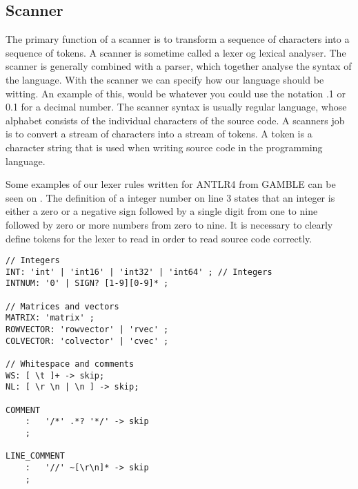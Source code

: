 \subsection{Scanner}
The primary function of a scanner is to transform a sequence of characters into a sequence of tokens.
A scanner is sometime called a lexer og lexical analyser.
The scanner is generally combined with a parser, which together analyse the syntax of the language.
With the scanner we can specify how our language should be witting. 
An example of this, would be whatever you could use the notation .1 or 0.1 for a decimal number.
The scanner syntax is usually regular language, whose alphabet consists of the individual characters of the source code.
A scanners job is to convert a stream of characters into a stream of tokens.
A token is a character string that is used when writing source code in the programming language.

Some examples of our lexer rules written for ANTLR4 from GAMBLE can be seen on .
The definition of a integer number on line 3 states that an integer is either a zero or a negative sign followed by a single digit from one to nine followed by zero or more numbers from zero to nine.
It is necessary to clearly define tokens for the lexer to read in order to read source code correctly. \citep{Crafting_book}

\begin{lstlisting}[caption=Example of our lexer rules for ANTLR4,frame=tlrb,label={lst:token}]
// Integers
INT: 'int' | 'int16' | 'int32' | 'int64' ; // Integers
INTNUM: '0' | SIGN? [1-9][0-9]* ;

// Matrices and vectors
MATRIX: 'matrix' ;
ROWVECTOR: 'rowvector' | 'rvec' ;
COLVECTOR: 'colvector' | 'cvec' ;  

// Whitespace and comments
WS: [ \t ]+ -> skip;
NL: [ \r \n | \n ] -> skip;

COMMENT
    :   '/*' .*? '*/' -> skip
    ;

LINE_COMMENT
    :   '//' ~[\r\n]* -> skip
    ;
\end{lstlisting}